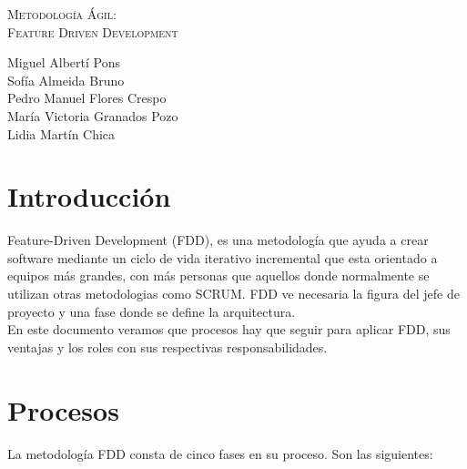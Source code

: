 \documentclass[11pt]{article}
\begin{document}
\begin{titlepage}
\centering
\vspace{4.5cm}
{\scshape\LARGE Metodología Ágil:\\ Feature Driven Development\par}
\vspace{1.5cm}


\vspace{3cm}
{\scshape\large \par}
\vspace{1cm}

{Miguel Albertí Pons\\
Sofía Almeida Bruno\\
Pedro Manuel Flores Crespo\\
María Victoria Granados Pozo\\
Lidia Martín Chica
\par}

\end{titlepage}

\thispagestyle{empty}
\tableofcontents

\newpage

\section{Introducción}

Feature-Driven Development (FDD), es una metodología que ayuda a crear software mediante un ciclo de vida iterativo incremental que esta orientado a equipos más grandes, con más personas que aquellos donde normalmente se utilizan otras metodologias como SCRUM. FDD ve necesaria la figura del jefe de proyecto y una fase donde se define la arquitectura. \\
En este documento veramos que procesos hay que seguir para aplicar FDD, sus ventajas y los roles con sus respectivas responsabilidades.




\section{Procesos}

La metodología FDD consta de cinco fases en su proceso. Son las siguientes:
\end{document}
